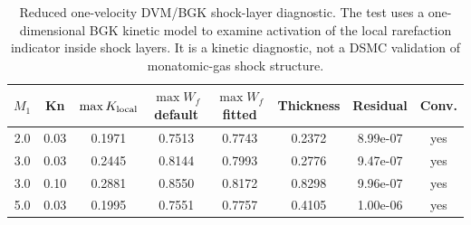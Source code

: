 \begin{table}[t]
\centering
\caption{Reduced one-velocity DVM/BGK shock-layer diagnostic. The test uses a one-dimensional BGK kinetic model to examine activation of the local rarefaction indicator inside shock layers. It is a kinetic diagnostic, not a DSMC validation of monatomic-gas shock structure.}
\label{tab:exp19_normal_shock}
\begin{tabular}{cccccccc}
\toprule
$M_1$ & Kn & $\max K_{\rm local}$ & $\max W_f$ default & $\max W_f$ fitted & Thickness & Residual & Conv. \\
\midrule
2.0 & 0.03 & 0.1971 & 0.7513 & 0.7743 & 0.2372 & 8.99e-07 & yes \\
3.0 & 0.03 & 0.2445 & 0.8144 & 0.7993 & 0.2776 & 9.47e-07 & yes \\
3.0 & 0.10 & 0.2881 & 0.8550 & 0.8172 & 0.8298 & 9.96e-07 & yes \\
5.0 & 0.03 & 0.1995 & 0.7551 & 0.7757 & 0.4105 & 1.00e-06 & yes \\
\bottomrule
\end{tabular}
\end{table}

